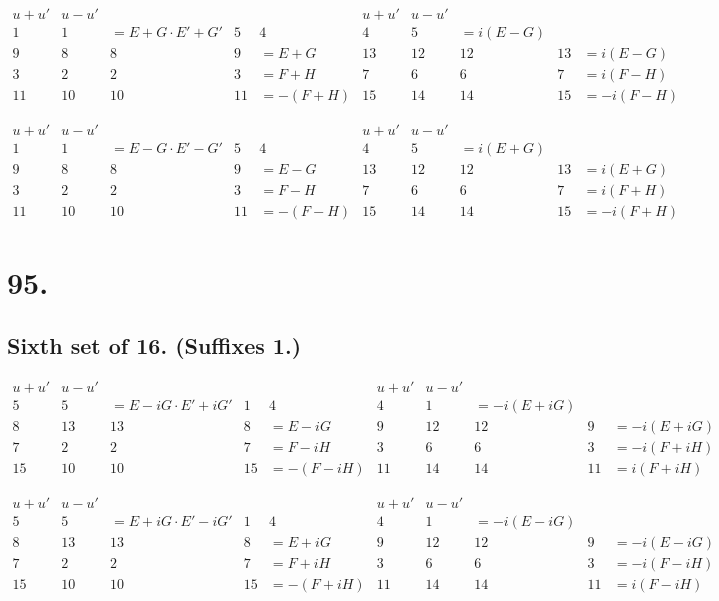 \documentclass[11pt,a4paper]{book}
\begin{document}
\[
\begin{array}{c|cccc|c|cccc}
u+u' & u-u' & & & & u+u' & u-u' & & & \\
\hline
1 & 1 & = E+G \cdot E'+G' & 5 & 4 & 4 & 5 & = i(E-G) \\
9 & 8 & 8 & 9 & = E+G & 13 & 12 & 12 & 13 & = i(E-G) \\
3 & 2 & 2 & 3 & = F+H & 7 & 6 & 6 & 7 & = i(F-H) \\
11 & 10 & 10 & 11 & = -(F+H) & 15 & 14 & 14 & 15 & = -i(F-H)
\end{array}
\]

\[
\begin{array}{c|cccc|c|cccc}
u+u' & u-u' & & & & u+u' & u-u' & & & \\
\hline
1 & 1 & = E-G \cdot E'-G' & 5 & 4 & 4 & 5 & = i(E+G) \\
9 & 8 & 8 & 9 & = E-G & 13 & 12 & 12 & 13 & = i(E+G) \\
3 & 2 & 2 & 3 & = F-H & 7 & 6 & 6 & 7 & = i(F+H) \\
11 & 10 & 10 & 11 & = -(F-H) & 15 & 14 & 14 & 15 & = -i(F+H)
\end{array}
\]

\newpage
\section*{95.}
\label{sec:95}

\subsection*{Sixth set of 16. (Suffixes 1.)}

\[
\begin{array}{c|cccc|c|cccc}
u+u' & u-u' & & & & u+u' & u-u' & & & \\
\hline
5 & 5 & = E-iG \cdot E'+iG' & 1 & 4 & 4 & 1 & = -i(E+iG) \\
8 & 13 & 13 & 8 & = E-iG & 9 & 12 & 12 & 9 & = -i(E+iG) \\
7 & 2 & 2 & 7 & = F-iH & 3 & 6 & 6 & 3 & = -i(F+iH) \\
15 & 10 & 10 & 15 & = -(F-iH) & 11 & 14 & 14 & 11 & = i(F+iH)
\end{array}
\]

\[
\begin{array}{c|cccc|c|cccc}
u+u' & u-u' & & & & u+u' & u-u' & & & \\
\hline
5 & 5 & = E+iG \cdot E'-iG' & 1 & 4 & 4 & 1 & = -i(E-iG) \\
8 & 13 & 13 & 8 & = E+iG & 9 & 12 & 12 & 9 & = -i(E-iG) \\
7 & 2 & 2 & 7 & = F+iH & 3 & 6 & 6 & 3 & = -i(F-iH) \\
15 & 10 & 10 & 15 & = -(F+iH) & 11 & 14 & 14 & 11 & = i(F-iH)
\end{array}
\]
\end{document}
